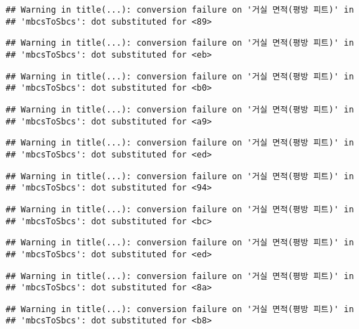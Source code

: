 \documentclass[
]{article}
\begin{document}
\begin{verbatim}
## Warning in title(...): conversion failure on '거실 면적(평방 피트)' in
## 'mbcsToSbcs': dot substituted for <89>
\end{verbatim}

\begin{verbatim}
## Warning in title(...): conversion failure on '거실 면적(평방 피트)' in
## 'mbcsToSbcs': dot substituted for <eb>
\end{verbatim}

\begin{verbatim}
## Warning in title(...): conversion failure on '거실 면적(평방 피트)' in
## 'mbcsToSbcs': dot substituted for <b0>
\end{verbatim}

\begin{verbatim}
## Warning in title(...): conversion failure on '거실 면적(평방 피트)' in
## 'mbcsToSbcs': dot substituted for <a9>
\end{verbatim}

\begin{verbatim}
## Warning in title(...): conversion failure on '거실 면적(평방 피트)' in
## 'mbcsToSbcs': dot substituted for <ed>
\end{verbatim}

\begin{verbatim}
## Warning in title(...): conversion failure on '거실 면적(평방 피트)' in
## 'mbcsToSbcs': dot substituted for <94>
\end{verbatim}

\begin{verbatim}
## Warning in title(...): conversion failure on '거실 면적(평방 피트)' in
## 'mbcsToSbcs': dot substituted for <bc>
\end{verbatim}

\begin{verbatim}
## Warning in title(...): conversion failure on '거실 면적(평방 피트)' in
## 'mbcsToSbcs': dot substituted for <ed>
\end{verbatim}

\begin{verbatim}
## Warning in title(...): conversion failure on '거실 면적(평방 피트)' in
## 'mbcsToSbcs': dot substituted for <8a>
\end{verbatim}

\begin{verbatim}
## Warning in title(...): conversion failure on '거실 면적(평방 피트)' in
## 'mbcsToSbcs': dot substituted for <b8>
\end{verbatim}
\end{document}
